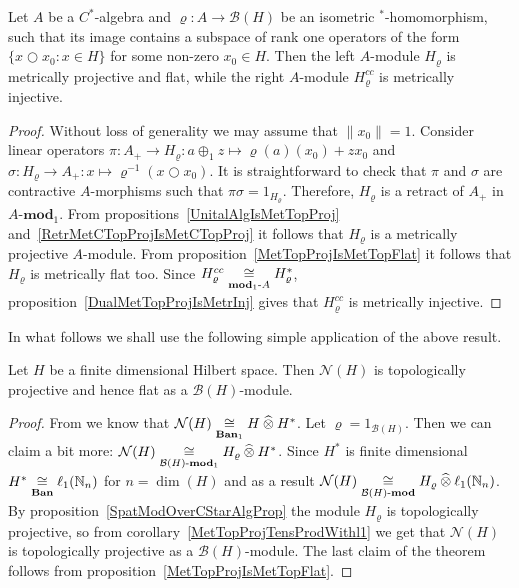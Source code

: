 \begin{proposition}\label{SpatModOverCStarAlgProp} Let $A$ be a $C^*$-algebra
and $\varrho:A\to\mathcal{B}(H)$ be an isometric ${}^*$-homomorphism, such that
its image contains a subspace of rank one operators of the 
form $ \{x\bigcirc x_0:x\in H \}$ for some non-zero $x_0\in H$. 
Then the left $A$-module $H_\varrho$ is metrically projective and flat, 
while the  right $A$-module $H_\varrho^{cc}$ is metrically injective.
\end{proposition}
\begin{proof} Without loss of generality we may assume that $\lVert x_0\rVert=1$.
Consider linear operators 
$\pi:A_+\to H_\varrho:a\oplus_1 z\mapsto \varrho(a)(x_0)+zx_0$ 
and $\sigma:H_\varrho\to A_+:x\mapsto \varrho^{-1}(x\bigcirc x_0)$. 
It is straightforward to check that $\pi$ and
$\sigma$ are contractive $A$-morphisms such that $\pi\sigma=1_{H_\varrho}$.
Therefore, $H_\varrho$ is a retract of $A_+$ in $A\text{-}\mathbf{mod}_1$. From
propositions~\ref{UnitalAlgIsMetTopProj} and~\ref{RetrMetCTopProjIsMetCTopProj} 
it follows that $H_\varrho$ is a metrically projective $A$-module. From
proposition~\ref{MetTopProjIsMetTopFlat} it follows that $H_\varrho$ is
metrically flat too. Since $H_\varrho^{cc}\mathrel{\mathop{\cong}\limits_{\mathbf{mod}_1\text{-}A}}H_\varrho^*$,
proposition~\ref{DualMetTopProjIsMetrInj} gives that $H_\varrho^{cc}$ is
metrically injective.
\end{proof}

In what follows we shall use the following simple application of the above
result.

\begin{proposition}\label{FinDimNHModTopProjFlat} Let $H$ be a finite
dimensional Hilbert space. Then $\mathcal{N}(H)$ is topologically projective and
hence flat as a $\mathcal{B}(H)$-module.
\end{proposition}
\begin{proof} From \cite[proposition 0.3.38]{HelBanLocConvAlg} we know that
$\mathcal{N}(H)\mathrel{\mathop{\cong}\limits_{\mathbf{Ban}_1}}H\mathbin{\widehat{\otimes}} H^*$. Let
$\varrho=1_{\mathcal{B}(H)}$. Then we can claim a bit more:
$\mathcal{N}(H)\mathrel{\mathop{\cong}\limits_{\mathcal{B}(H)\text{-}\mathbf{mod}_1}} H_\varrho\mathbin{\widehat{\otimes}} H^*$.
Since $H^*$ is finite dimensional
$H^*\mathrel{\mathop{\cong}\limits_{\mathbf{Ban}}}\ell_1(\mathbb{N}_n)$ for $n=\dim(H)$ and as a result
$\mathcal{N}(H)\mathrel{\mathop{\cong}\limits_{\mathcal{B}(H)\text{-}\mathbf{mod}}}
H_\varrho\mathbin{\widehat{\otimes}}\ell_1(\mathbb{N}_n)$. By
proposition~\ref{SpatModOverCStarAlgProp} the module $H_\varrho$ is
topologically projective, so from corollary~\ref{MetTopProjTensProdWithl1} we
get that $\mathcal{N}(H)$ is topologically projective as a
$\mathcal{B}(H)$-module. The last claim of the theorem follows from
proposition~\ref{MetTopProjIsMetTopFlat}.
\end{proof}

